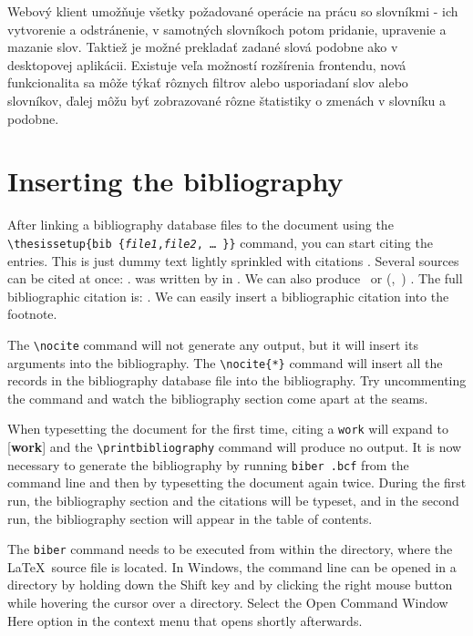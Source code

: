 \documentclass[
  digital, %
  table,   %
  lof,     %
  lot,     %
]{fithesis3}
\begin{document}
Webový klient umožňuje všetky požadované operácie na prácu so slovníkmi - ich vytvorenie a odstránenie, v samotných slovníkoch potom pridanie, upravenie a mazanie slov. Taktiež je možné prekladať zadané slová podobne ako v desktopovej aplikácii. Existuje veľa možností rozšírenia frontendu, nová funkcionalita sa môže týkať rôznych filtrov alebo usporiadaní slov alebo slovníkov, ďalej môžu byť zobrazované rôzne štatistiky o zmenách v slovníku a podobne.


\chapter{Inserting the bibliography}
After linking a bibliography data\-base files to the document using
the \verb"\"\texttt{thesissetup\{bib\discretionary{=}{=}{=}%
\{\textit{file1},\textit{file2},\,\ldots\,\}\}} command, you can
start citing the entries. This is just dummy text
\parencite{borgman03} lightly sprinkled with citations
\parencite[p.~123]{greenberg98}. Several sources can be cited at
once: \cite{borgman03,greenberg98,thanh01}.
 was written by \citeauthor{greenberg98} in
\citeyear{greenberg98}. We can also produce \textcite{greenberg98}%
\ or %
\def\citeauthoryear#1{(\textcite{#1},~\citeyear{#1})}%
\citeauthoryear{greenberg98}%
. The full bibliographic citation is:
\emph{}. We can easily insert a bibliographic
citation into the footnote.

The \verb"\nocite" command will not generate any
output\nocite{muni}, but it will insert its arguments into
the bibliography. The \verb"\nocite{*}" command will insert all the
records in the bibliography database file into the bibliography.
Try uncommenting the command
and watch the bibliography section come apart at the seams.

When typesetting the document for the first time, citing a
\texttt{work} will expand to [\textbf{work}] and the
\verb"\printbibliography" command will produce no output. It is now
necessary to generate the bibliography by running \texttt{biber
\jobname.bcf} from the command line and then by typesetting the
document again twice. During the first run, the bibliography
section and the citations will be typeset, and in the second run,
the bibliography section will appear in the table of contents.

The \texttt{biber} command needs to be executed from within the
directory, where the \LaTeX\ source file is located. In Windows,
the command line can be opened in a directory by holding down the
\textsf{Shift} key and by clicking the right mouse button while
hovering the cursor over a directory.  Select the \textsf{Open
Command Window Here} option in the context menu that opens shortly
afterwards.
\end{document}
